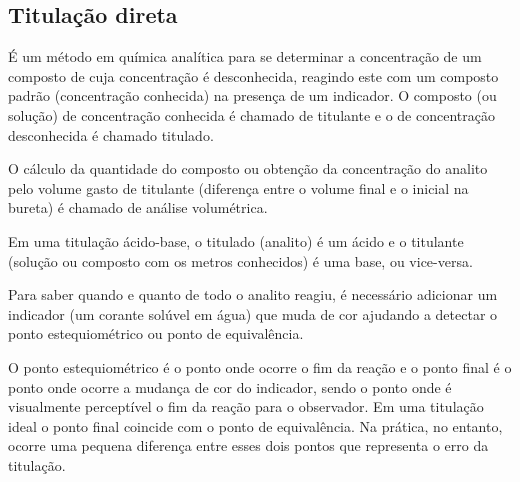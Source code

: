     \subsection{Titulação direta}\label{titulacao}

     É um método em química analítica para se determinar a concentração de um composto de cuja concentração é
     desconhecida, reagindo este com um composto padrão (concentração conhecida) na presença de um indicador.
     O composto (ou solução) de concentração conhecida é chamado de titulante e o de concentração desconhecida
     é chamado titulado.

     O cálculo da quantidade do composto ou obtenção da concentração do analito pelo volume gasto de titulante
     (diferença entre o volume final e o inicial na bureta) é chamado de análise volumétrica.

     Em uma titulação ácido-base, o titulado (analito) é um ácido e o titulante (solução ou composto com os
     metros conhecidos) é uma base, ou vice-versa.

     Para saber quando e quanto de todo o analito reagiu, é necessário adicionar um indicador (um corante
     solúvel em água) que muda de cor ajudando a detectar o ponto estequiométrico ou ponto de equivalência.

     O ponto estequiométrico é o ponto onde ocorre o fim da reação e o ponto final é o ponto onde ocorre a
     mudança de cor do indicador, sendo o ponto onde é visualmente perceptível o fim da reação para o
     observador. Em uma titulação ideal o ponto final coincide com o ponto de equivalência. Na prática, no
     entanto, ocorre uma pequena diferença entre esses dois pontos que representa o erro da titulação.
